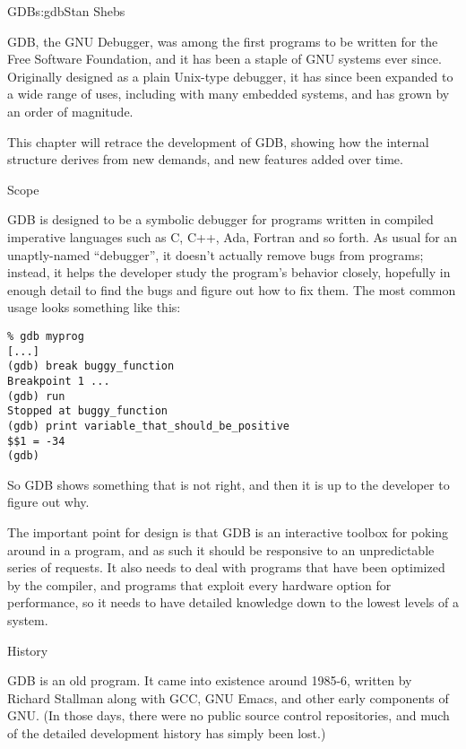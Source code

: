 \begin{aosachapter}{GDB}{s:gdb}{Stan Shebs}

GDB, the GNU Debugger, was among the first programs to be written for
the Free Software Foundation, and it has been a staple of GNU systems
ever since.  Originally designed as a plain Unix-type debugger, it has
since been expanded to a wide range of uses, including with many
embedded systems, and has grown by an order of magnitude.

This chapter will retrace the development of GDB, showing how the
internal structure derives from new demands, and new features added
over time.

Scope

GDB is designed to be a symbolic debugger for programs written in
compiled imperative languages such as C, C++, Ada, Fortran and so
forth.  As usual for an unaptly-named ``debugger'', it doesn't
actually remove bugs from programs; instead, it helps the developer
study the program's behavior closely, hopefully in enough detail to
find the bugs and figure out how to fix them.  The most common usage
looks something like this:

\begin{verbatim}
% gdb myprog
[...]
(gdb) break buggy_function
Breakpoint 1 ...
(gdb) run
Stopped at buggy_function
(gdb) print variable_that_should_be_positive
$$1 = -34
(gdb)
\end{verbatim}

So GDB shows something that is not right, and then it is up to the developer
to figure out why.

The important point for design is that GDB is an interactive toolbox
for poking around in a program, and as such it should be responsive
to an unpredictable series of requests.  It also needs to deal with
programs that have been optimized by the compiler, and programs that
exploit every hardware option for performance, so it needs to have
detailed knowledge down to the lowest levels of a system.

\begin{aosasect1}{History}

GDB is an old program.  It came into existence around 1985-6, written
by Richard Stallman along with GCC, GNU Emacs, and other early
components of GNU.  (In those days, there were no public source
control repositories, and much of the detailed development history
has simply been lost.)

\end{aosasect1}


\end{aosachapter}
